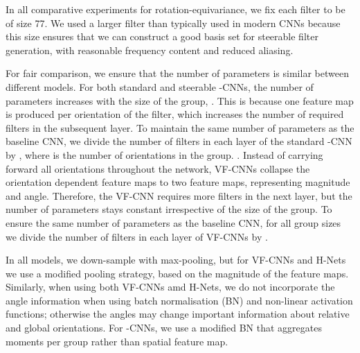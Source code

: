 \documentclass[journal]{IEEEtran}
\newcommand\mg[1]{{\color{black}{#1}}}
\begin{document}
    	In all comparative experiments for rotation-equivariance, we fix each filter to be of size 77. We used a larger filter than typically used in modern CNNs because this size ensures that we can construct a good basis set for steerable filter generation, with reasonable frequency content and reduced aliasing. 
    	
	    For fair comparison, we ensure that the number of parameters is similar between different models. For both standard and steerable -CNNs, the number of parameters increases with the size of the group, \mg{if we fix the number of filters in each layer}. This is because one feature map is produced per orientation of the filter, which increases the number of required filters in the subsequent layer. To maintain the same number of parameters as the baseline CNN, we divide the number of filters in each layer of the standard -CNN by , where  is the number of orientations in the group. \mg{Steerable -CNNs learn  parameters (or  complex parameters) for each filter, where typically . Therefore, the number of filters in each layer of a steerable -CNN should be divided by }. Instead of carrying forward all orientations throughout the network, VF-CNNs collapse the orientation dependent feature maps to two feature maps, representing magnitude and angle. Therefore, the VF-CNN requires more filters in the next layer, but the number of parameters stays constant irrespective of the size of the group. To ensure the same number of parameters as the baseline CNN, for all group sizes we divide the number of filters in each layer of VF-CNNs by . \mg{Each H-Net filter is constrained to be a complex circular harmonic, parameterised by  radial terms and a single phase offset term. Also, the number of parameters is dependent on the maximum frequency  of the filters. Specifically, in H-Nets frequencies in the range  are considered, equating to a total of  frequency terms. Therefore, to ensure a similar number of parameters as the standard CNN, we multiply the number of filters in each layer of a H-Net by .}
	    
	    In all models, we down-sample with max-pooling, but for VF-CNNs and H-Nets we use a modified pooling strategy, based on the magnitude of the feature maps. Similarly, when using both VF-CNNs amd H-Nets, we do not incorporate the angle information when using batch normalisation (BN) and non-linear activation functions; otherwise the angles may change important information about relative and global orientations. For -CNNs, we use a modified BN that aggregates moments per group rather than spatial feature map. 
	    
\end{document}
